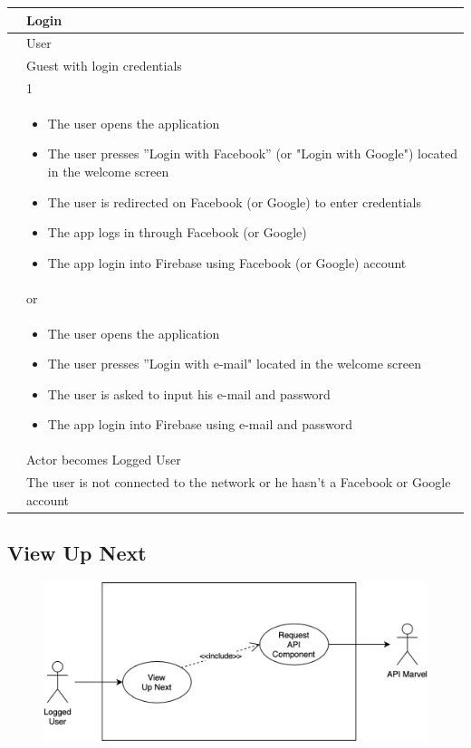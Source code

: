 {\renewcommand{\arraystretch}{2}
{\begin{center}
\begin{tabular}{ | m{4cm} | m{9cm} | } 
 \hline
 {\centering{\textbf{Name}}} & Login \\
 \hline
 {\centering{\textbf{Actor}}} & User \\
 \hline
 {\centering{\textbf{Entry Condition}}} & Guest with login credentials \\
 \hline
 {\centering{\textbf{Goal}}} & 1 \\
 \hline
 {\centering{\textbf{Event flow}}} & \begin{itemize}[leftmargin=*]
 	\item The user opens the application
	\item The user presses ”Login with Facebook” (or "Login with Google") located in the welcome screen
	\item The user is redirected on Facebook (or Google) to enter credentials
	\item The app logs in through Facebook (or Google)
	\item The app login into Firebase using Facebook (or Google) account 
	\end{itemize} \\	
	 & or \\
	 & \begin{itemize}[leftmargin=*]
 	\item The user opens the application
	\item The user presses ”Login with e-mail" located in the welcome screen
	\item The user is asked to input his e-mail and password
	\item The app login into Firebase using e-mail and password
	\end{itemize} \\
 \hline
 {\centering{\textbf{Exit condition}}} & Actor becomes Logged User \\
 \hline
 {\centering{\textbf{Exceptions}}} & The user is not connected to the network or he hasn’t a Facebook or Google account \\
 \hline
\end{tabular}
\end{center}}

\clearpage

\subsection{View Up Next}
\begin{figure}[h]
\centering
\includegraphics[width=\textwidth]{img/usecases/viewupnext}
\end{figure}

}
